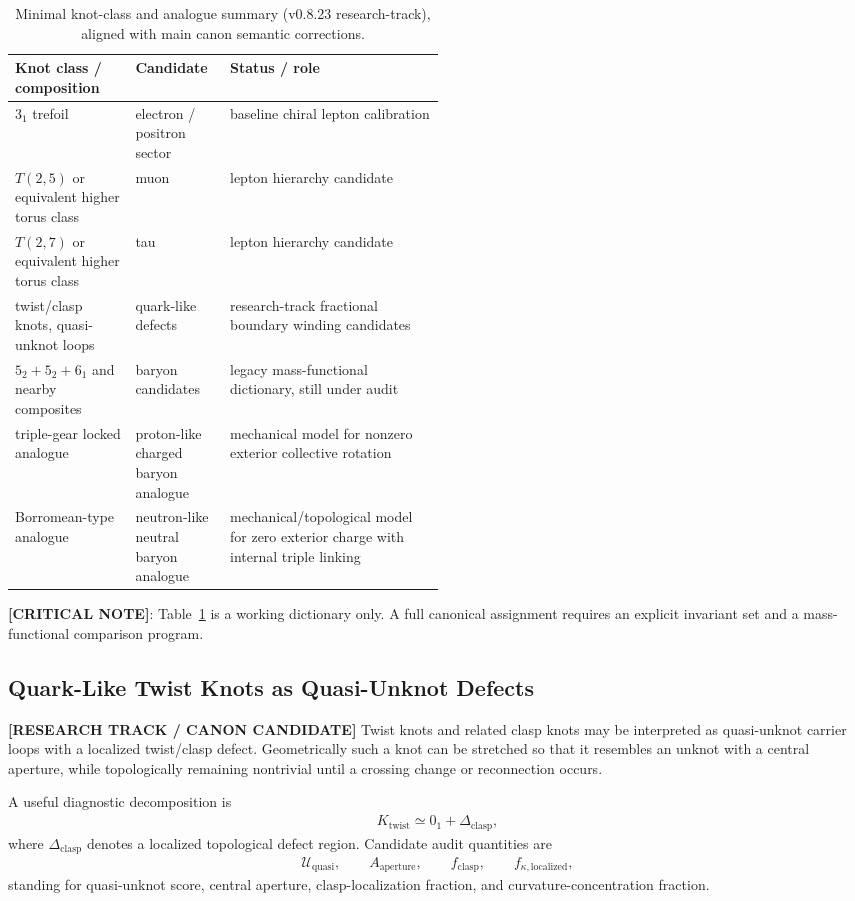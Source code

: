 \begin{table}[h]
\centering
\begin{tabularx}{\linewidth}{p{0.28\linewidth}p{0.22\linewidth}X}
\hline
Knot class / composition & Candidate & Status / role \\
\hline
$3_1$ trefoil & electron / positron sector & baseline chiral lepton calibration \\
$T(2,5)$ or equivalent higher torus class & muon & lepton hierarchy candidate \\
$T(2,7)$ or equivalent higher torus class & tau & lepton hierarchy candidate \\
twist/clasp knots, quasi-unknot loops & quark-like defects & research-track fractional boundary winding candidates \\
$5_2+5_2+6_1$ and nearby composites & baryon candidates & legacy mass-functional dictionary, still under audit \\
triple-gear locked analogue & proton-like charged baryon analogue & mechanical model for nonzero exterior collective rotation \\
Borromean-type analogue & neutron-like neutral baryon analogue & mechanical/topological model for zero exterior charge with internal triple linking \\
\hline
\end{tabularx}
\caption{Minimal knot-class and analogue summary (v0.8.23 research-track), aligned with main canon semantic corrections.}
\label{tab:particle-candidates}
\end{table}

\textbf{[CRITICAL NOTE]}: Table~\ref{tab:particle-candidates} is a working dictionary only. A full canonical assignment requires an explicit invariant set and a mass-functional comparison program.


\subsection{Quark-Like Twist Knots as Quasi-Unknot Defects}
\label{subsec:rt_quark_twist_quasi_unknot}

\textbf{[RESEARCH TRACK / CANON CANDIDATE]} Twist knots and related clasp knots may be interpreted as quasi-unknot carrier loops with a localized twist/clasp defect. Geometrically such a knot can be stretched so that it resembles an unknot with a central aperture, while topologically remaining nontrivial until a crossing change or reconnection occurs.

A useful diagnostic decomposition is
\begin{align}
    K_{\mathrm{twist}}
    \simeq
    0_1 + \Delta_{\mathrm{clasp}},
\end{align}
where $\Delta_{\mathrm{clasp}}$ denotes a localized topological defect region. Candidate audit quantities are
\begin{align}
    \mathcal{U}_{\mathrm{quasi}},\qquad
    A_{\mathrm{aperture}},\qquad
    f_{\mathrm{clasp}},\qquad
    f_{\kappa,\mathrm{localized}},
\end{align}
standing for quasi-unknot score, central aperture, clasp-localization fraction, and curvature-concentration fraction.


